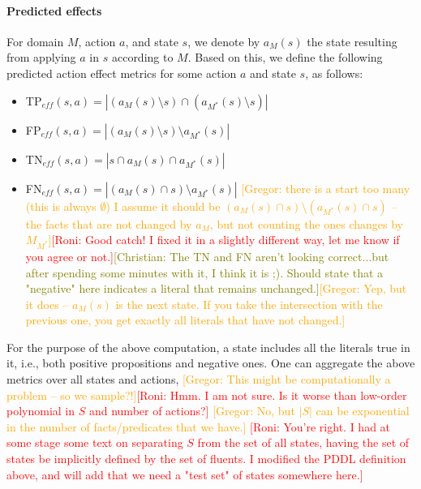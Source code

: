 \documentclass{article}
\theoremstyle{definition}
\theoremstyle{remark}
\newcommand{\realm}{\ensuremath{M^*}\xspace}
\newcommand{\eff}{\ensuremath{\textit{eff}}\xspace}
\newcommand{\roni}[1]{{\textcolor{red}{[Roni: #1]}}}
\newcommand{\yarin}[1]{{\textcolor{teal}{[Yarin: #1]}}}
\newcommand{\gregor}[1]{{\textcolor{orange}{[Gregor: #1]}}}
\newcommand{\cm}[1]{{\textcolor{olive}{[Christian: #1]}}}
\begin{document}
\paragraph{Predicted effects}
For domain $M$, action $a$, and state $s$, we denote by $a_M(s)$ the state resulting from applying $a$ in $s$ according to $M$. 
Based on this, we define the following predicted action effect metrics for some action $a$ and state $s$, as follows: 
\begin{itemize}
    \item TP$_{\eff}(s,a)=|(a_M(s)\setminus s)\cap (a_\realm(s)\setminus s)|$
    \item FP$_{\eff}(s,a)=|(a_M(s)\setminus s)\setminus a_\realm(s)|$ 
    \item TN$_{\eff}(s,a)=|s \cap a_M(s) \cap a_\realm(s)|$
    \item FN$_{\eff}(s,a)=|(a_M(s)\cap s)\setminus a_\realm(s)|$ \gregor{there is a start too many (this is always $\emptyset$) I assume it should be $(a_M(s)\cap s)\setminus (a_\realm(s) \cap s)$ -- the facts that are not changed by $a_M$, but not counting the ones changes by $M_\realm$}\roni{Good catch! I fixed it in a slightly different way, let me know if you agree or not.}\cm{The TN and FN aren't looking correct...but after spending some minutes with it, I think it is ;). Should state that a "negative" here indicates a literal that remains unchanged.}\gregor{Yep, but it does -- $a_M(s)$ is the next state. If you take the intersection with the previous one, you get exactly all literals that have not changed.}
\end{itemize}
For the purpose of the above computation, a state includes all the literals true in it, i.e., both positive propositions and negative ones. 
One can aggregate the above metrics over all states and actions, \gregor{This might be computationally a problem -- so we sample?!}\roni{Hmm. I am not sure. Is it worse than low-order polynomial in $S$ and number of actions?}
\gregor{No, but $|S|$ can be exponential in the number of facts/predicates that we have.}
\roni{You're right. I had at some stage some text on separating $S$ from the set of all states, having the set of states be implicitly defined by the set of fluents. I modified the PDDL definition above, and will add that we need a "test set" of states somewhere here.}
\end{document}
